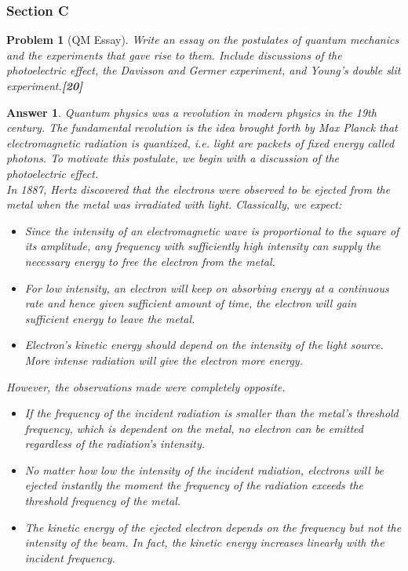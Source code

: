 \documentclass[a4paper]{article}
\newtheorem{ans}{Answer}[subsection]
\theoremstyle{new}
\newtheorem{qns}{Problem}[subsection]
\begin{document}
\subsubsection{Section C}
\begin{qns}[QM Essay]
Write an essay on the postulates of quantum mechanics and the experiments that gave rise to them. Include discussions of the photoelectric effect, the Davisson and Germer experiment, and Young’s double slit experiment.\hfill\textbf{[20]}
\end{qns}
\begin{ans}
Quantum physics was a revolution in modern physics in the 19th century. The fundamental revolution is the idea brought forth by Max Planck that electromagnetic radiation is quantized, i.e. light are packets of fixed energy called photons. To motivate this postulate, we begin with a discussion of the photoelectric effect.\\[5pt]
In 1887, Hertz discovered that the electrons were observed to be ejected from the metal when the metal was irradiated with light. Classically, we expect:
\begin{itemize}
\item Since the intensity of an electromagnetic wave is proportional to the square of its amplitude, any frequency with sufficiently high intensity can supply the necessary energy to free the electron from the metal.
\item For low intensity, an electron will keep on absorbing energy at a continuous rate and hence given sufficient amount of time, the electron will gain sufficient energy to leave the metal.
\item Electron's kinetic energy should depend on the intensity of the light source. More intense radiation will give the electron more energy.
\end{itemize}
However, the observations made were completely opposite.
\begin{itemize}
\item If the frequency of the incident radiation is smaller than the metal's threshold frequency, which is dependent on the metal, no electron can be emitted regardless of the radiation's intensity.
\item No matter how low the intensity of the incident radiation, electrons will be ejected instantly the moment the frequency of the radiation exceeds the threshold frequency of the metal.
\item The kinetic energy of the ejected electron depends on the frequency but not the intensity of the beam. In fact, the kinetic energy increases linearly with the incident frequency.

\end{itemize}
\end{ans}
\end{document}
